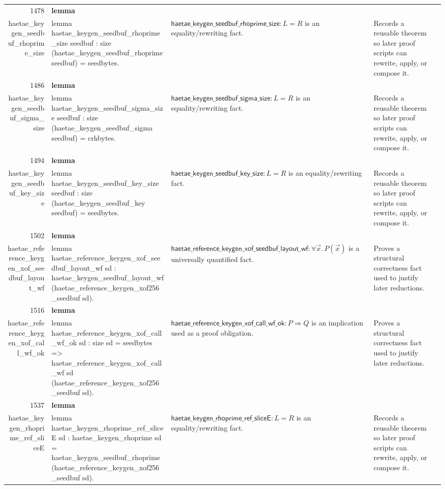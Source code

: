 \documentclass[10pt]{article}
\newcommand{\ec}[1]{\begingroup\ttfamily\scriptsize #1\endgroup}
\begin{document}
\begin{longtable}{r L{0.17\textwidth} L{0.26\textwidth} L{0.27\textwidth} L{0.20\textwidth}}
1478 & \textbf{lemma}\\\ec{haetae\_keygen\_seedbuf\_rhoprime\_size} & \ec{lemma haetae\_keygen\_seedbuf\_rhoprime\_size seedbuf : size (haetae\_keygen\_seedbuf\_rhoprime seedbuf) = seedbytes.} & \(\mathsf{haetae\_keygen\_seedbuf\_rhoprime\_size} : L = R\) is an equality/rewriting fact. & Records a reusable theorem so later proof scripts can rewrite, apply, or compose it. \\
1486 & \textbf{lemma}\\\ec{haetae\_keygen\_seedbuf\_sigma\_size} & \ec{lemma haetae\_keygen\_seedbuf\_sigma\_size seedbuf : size (haetae\_keygen\_seedbuf\_sigma seedbuf) = crhbytes.} & \(\mathsf{haetae\_keygen\_seedbuf\_sigma\_size} : L = R\) is an equality/rewriting fact. & Records a reusable theorem so later proof scripts can rewrite, apply, or compose it. \\
1494 & \textbf{lemma}\\\ec{haetae\_keygen\_seedbuf\_key\_size} & \ec{lemma haetae\_keygen\_seedbuf\_key\_size seedbuf : size (haetae\_keygen\_seedbuf\_key seedbuf) = seedbytes.} & \(\mathsf{haetae\_keygen\_seedbuf\_key\_size} : L = R\) is an equality/rewriting fact. & Records a reusable theorem so later proof scripts can rewrite, apply, or compose it. \\
1502 & \textbf{lemma}\\\ec{haetae\_reference\_keygen\_xof\_seedbuf\_layout\_wf} & \ec{lemma haetae\_reference\_keygen\_xof\_seedbuf\_layout\_wf sd : haetae\_keygen\_seedbuf\_layout\_wf (haetae\_reference\_keygen\_xof256\_seedbuf sd).} & \(\mathsf{haetae\_reference\_keygen\_xof\_seedbuf\_layout\_wf} : \forall \vec{x}.\, P(\vec{x})\) is a universally quantified fact. & Proves a structural correctness fact used to justify later reductions. \\
1516 & \textbf{lemma}\\\ec{haetae\_reference\_keygen\_xof\_call\_wf\_ok} & \ec{lemma haetae\_reference\_keygen\_xof\_call\_wf\_ok sd : size sd = seedbytes => haetae\_reference\_keygen\_xof\_call\_wf sd (haetae\_reference\_keygen\_xof256\_seedbuf sd).} & \(\mathsf{haetae\_reference\_keygen\_xof\_call\_wf\_ok} : P \Rightarrow Q\) is an implication used as a proof obligation. & Proves a structural correctness fact used to justify later reductions. \\
1537 & \textbf{lemma}\\\ec{haetae\_keygen\_rhoprime\_ref\_sliceE} & \ec{lemma haetae\_keygen\_rhoprime\_ref\_sliceE sd : haetae\_keygen\_rhoprime sd = haetae\_keygen\_seedbuf\_rhoprime (haetae\_reference\_keygen\_xof256\_seedbuf sd).} & \(\mathsf{haetae\_keygen\_rhoprime\_ref\_sliceE} : L = R\) is an equality/rewriting fact. & Records a reusable theorem so later proof scripts can rewrite, apply, or compose it. \\

\end{longtable}
\end{document}
